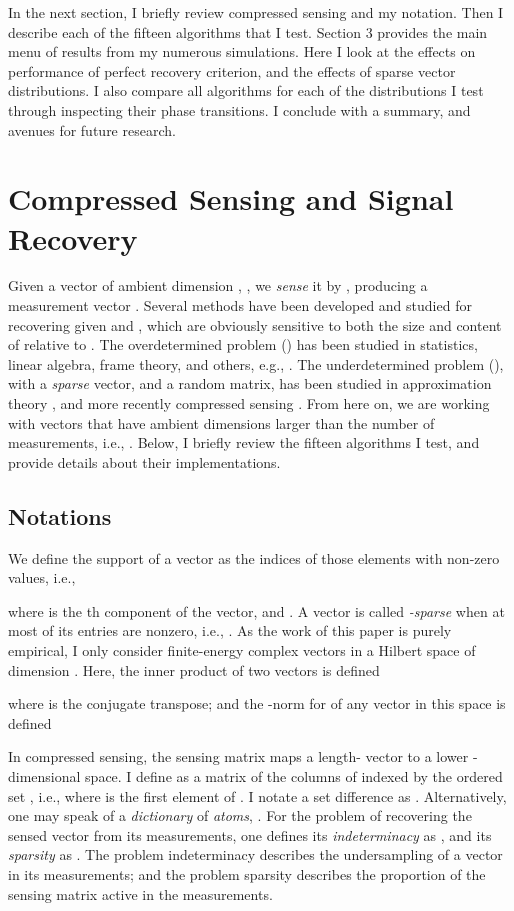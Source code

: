 \documentclass[11pt,draftcls,onecolumn]{IEEEtran}
\begin{document}
In the next section,
I briefly review compressed sensing and my notation.
Then I describe each of the fifteen algorithms that I test.
Section 3 provides the main menu of results 
from my numerous simulations.
Here I look at the effects on performance of perfect recovery criterion,
and the effects of sparse vector distributions.
I also compare all algorithms for each of the
distributions I test through inspecting 
their phase transitions.
I conclude with a summary, and avenues for future research.

\section{Compressed Sensing and Signal Recovery}
Given a vector of ambient dimension , ,
we {\em sense} it by ,
producing a measurement vector .
Several methods have been developed and studied for
recovering  given  and ,
which are obviously sensitive to
both the size and content of  relative to .
The overdetermined problem () has been studied in
statistics, linear algebra, frame theory, and others, e.g., \cite{Christensen2003,Mallat2009}.
The underdetermined problem (), 
with  a {\em sparse} vector,
and  a random matrix,
has been studied in approximation theory \cite{DeVore1998, Mallat2009},
and more recently compressed sensing \cite{Candes2006,Donoho2006b, Tropp2010}.
From here on, we are working with vectors that have ambient dimensions 
larger than the number of measurements, i.e., .
Below, I briefly review the fifteen algorithms I test,
and provide details about their implementations.

\subsection{Notations}
We define the support of a vector  
as the indices of those elements with non-zero values, i.e., 

where  is the th component of the vector,
and .
A vector  is called {\em-sparse} 
when at most  of its entries are nonzero, i.e., .
As the work of this paper is purely empirical,
I only consider finite-energy complex vectors 
in a Hilbert space of dimension .
Here, the inner product of two vectors is defined

where  is the conjugate transpose;
and the -norm for 
of any vector in this space is defined
 

In compressed sensing, the sensing matrix 
maps a length- vector to a lower -dimensional space.
I define  as a matrix of the  columns of  
indexed by the ordered set ,
i.e., 
where  is the first element of .
I notate a set difference as .
Alternatively, one may speak of a {\em dictionary} of {\em atoms},
.
For the problem of recovering the sensed vector from its measurements,
one defines its {\em indeterminacy} as ,
and its {\em sparsity} as .
The problem indeterminacy
describes the undersampling of a vector in its measurements;
and the problem sparsity describes the proportion of the sensing matrix 
active in the measurements.
\end{document}
